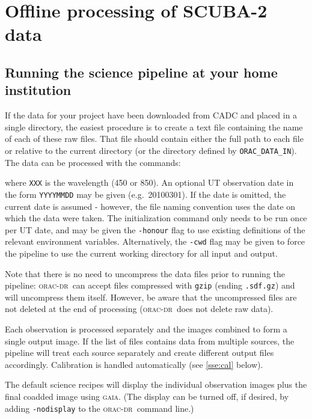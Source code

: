 \documentclass[twoside,11pt,nolof]{starlink}
\providecommand{\GAIA}{\textsc{gaia}}
\providecommand{\oracdr}{\textsc{orac-dr}}
\begin{document}
\section{Offline processing of SCUBA-2 data\label{se:offline}}

\subsection{Running the science pipeline at your home institution}

If the data for your project have been downloaded from CADC and placed
in a single directory, the easiest procedure is to create a text file
containing the name of each of these raw files. That file should
contain either the full path to each file or relative to the current
directory (or the directory defined by \verb+ORAC_DATA_IN+). The data
can be processed with the commands:
\begin{terminalv}
\end{terminalv}
where \verb+XXX+ is the wavelength (450 or 850). An optional UT
observation date in the form \verb+YYYYMMDD+ may be given
(e.g.\ 20100301). If the date is omitted, the current date is assumed
- however, the file naming convention uses the date on which the data
were taken. The initialization command only needs to be run once per
UT date, and may be given the \verb+-honour+ flag to use existing
definitions of the relevant environment variables. Alternatively, the
\verb+-cwd+ flag may be given to force the pipeline to use the current
working directory for all input and output.

Note that there is no need to uncompress the data files prior to
running the pipeline: \oracdr\ can accept files compressed with
\verb+gzip+ (ending \verb+.sdf.gz+) and will uncompress them
itself. However, be aware that the uncompressed files are not deleted
at the end of processing (\oracdr\ does not delete raw data).

Each observation is processed separately and the images combined to
form a single output image. If the list of files contains data from
multiple sources, the pipeline will treat each source separately and
create different output files accordingly. Calibration is handled
automatically (see \ref{sse:cal} below).

The default science recipes will display the individual observation
images plus the final coadded image using \GAIA. (The display can be
turned off, if desired, by adding \texttt{-nodisplay} to the
\oracdr\ command line.)
\end{document}

